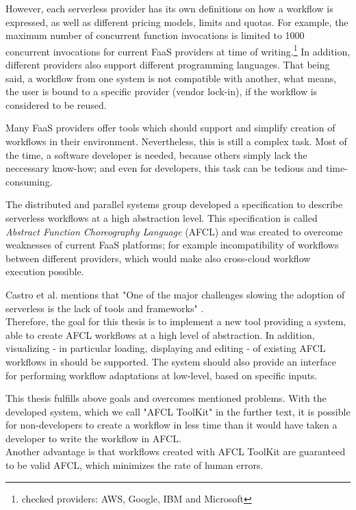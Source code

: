 \documentclass[a4paper,top=25mm,bottom=25mm,12pt,pdftex,halfparskip,twoside,bibtotoc,numbers=noenddot]{scrbook}
\begin{document}
However, each serverless provider has its own definitions on how a workflow is expressed, as well as different pricing models, limits and quotas. For example, the maximum number of concurrent function invocations is limited to 1000 concurrent invocations for current FaaS providers at time of writing.\footnote{checked providers: AWS, Google, IBM and Microsoft}
In addition, different providers also support different programming languages. That being said, a workflow from one system is not compatible with another, what means, the user is bound to a specific provider (vendor lock-in), if the workflow is considered to be reused.

Many FaaS providers offer tools which should support and simplify creation of workflows in their environment. Nevertheless, this is still a complex task. Most of the time, a software developer is needed, because others simply lack the neccessary know-how; and even for developers, this task can be tedious and time-consuming.

The distributed and parallel systems group developed a specification to describe serverless workflows at a high abstraction level. This specification is called \emph{Abstract Function Choreography Language} (AFCL) and was created to overcome weaknesses  of current FaaS platforms; for example incompatibility of workflows between different providers, which would make also cross-cloud workflow execution possible.

Castro et al. mentions that "One of the major challenges slowing the adoption of serverless is the lack of tools and frameworks" \cite{articles-rise-of-serverless-castro}.\\
Therefore, the goal for this thesis is to implement a new tool providing a system, able to create AFCL workflows at a high level of abstraction. In addition, visualizing - in particular loading, displaying and editing - of existing AFCL workflows in should be supported.
The system should also provide an interface for performing workflow adaptations at low-level, based on specific inputs.

This thesis fulfills above goals and overcomes mentioned problems.
With the developed system, which we call "AFCL ToolKit" in the further text, it is possible for non-developers to create a workflow in less time than it would have taken a developer to write the workflow in AFCL.\\
Another advantage is that workflows created with AFCL ToolKit are guaranteed to be valid AFCL, which minimizes the rate of human errors.
\end{document}
